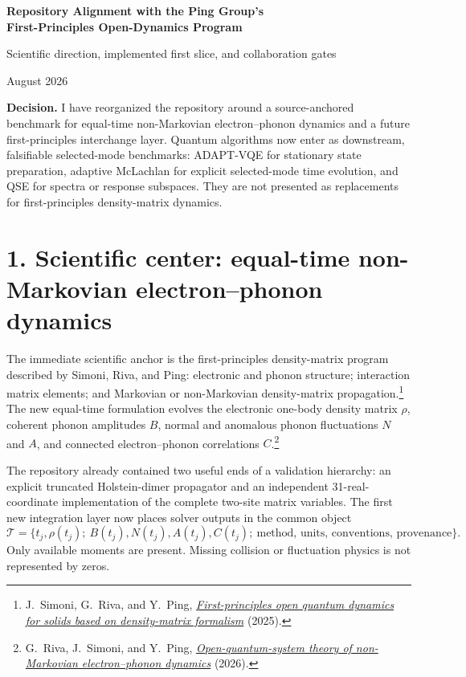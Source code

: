 \documentclass[11pt]{article}
\begin{document}
\begin{center}
  {\Large\bfseries\color{programblue}
  Repository Alignment with the Ping Group's\\[2pt]
  First-Principles Open-Dynamics Program}

  \vspace{6pt}
  {\large Scientific direction, implemented first slice, and collaboration gates}

  \vspace{5pt}
  {\small August 2026}
\end{center}

\vspace{4pt}
\noindent\colorbox{softblue}{%
  \parbox{0.965\linewidth}{%
  \textbf{Decision.} I have reorganized the repository around a
  source-anchored benchmark for equal-time non-Markovian electron--phonon
  dynamics and a future first-principles interchange layer. Quantum algorithms
  now enter as downstream, falsifiable selected-mode benchmarks: ADAPT-VQE for
  stationary state preparation, adaptive McLachlan for explicit selected-mode
  time evolution, and QSE for spectra or response subspaces. They are not
  presented as replacements for first-principles density-matrix dynamics.}}

\section*{1. Scientific center: equal-time non-Markovian electron--phonon dynamics}

The immediate scientific anchor is the first-principles density-matrix program
described by Simoni, Riva, and Ping: electronic and phonon structure;
interaction matrix elements; and Markovian or non-Markovian density-matrix
propagation.\footnote{J.~Simoni, G.~Riva, and Y.~Ping,
\href{https://arxiv.org/html/2504.17936v2}{\emph{First-principles open quantum
dynamics for solids based on density-matrix formalism}} (2025).}
The new equal-time formulation evolves the electronic one-body density matrix
\(\rho\), coherent phonon amplitudes \(B\), normal and anomalous phonon
fluctuations \(N\) and \(A\), and connected electron--phonon correlations
\(C\).\footnote{G.~Riva, J.~Simoni, and Y.~Ping,
\href{https://arxiv.org/html/2606.22233v1}{\emph{Open-quantum-system theory of
non-Markovian electron--phonon dynamics}} (2026).}

The repository already contained two useful ends of a validation hierarchy:
an explicit truncated Holstein-dimer propagator and an independent
31-real-coordinate implementation of the complete two-site matrix variables.
The first new integration layer now places solver outputs in the common object
\[
\mathcal T=\{t_j,\rho(t_j);\ B(t_j),N(t_j),A(t_j),C(t_j);\
\text{method, units, conventions, provenance}\}.
\]
Only available moments are present. Missing collision or fluctuation physics is
not represented by zeros.
\end{document}
